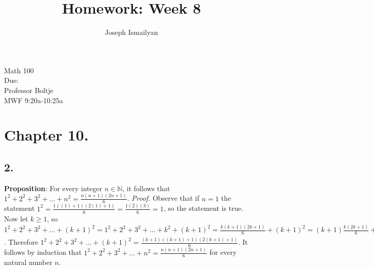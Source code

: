 \documentclass[12pt]{article}
\newcommand{\dueDate}{\formatdate{22}{11}{2017}} %
\newcommand{\hwNum}{8}
\begin{document}
	
	\title{Homework: Week \hwNum}
	\author{Joseph Ismailyan}
	\date{}
	\maketitle
	\begin{flushleft}
		Math 100 \\
		Due: \dueDate \\ 
		Professor Boltje \\
		MWF 9:20a-10:25a
	\end{flushleft}
	
	
	\begin{minipage}[t]{0.40\textwidth}
		
		
		
		\section*{Chapter 10. }
		\subsection*{2.}
		\textbf{Proposition}: For every integer $ n\in\mathbb{N} $, it follows that $ 1^2+2^2+3^2+\ldots+n^2=\frac{n(n+1)(2n+1)}{6} $.  
		\newline\textit{Proof.} Observe that if $ n=1 $ the statement $ 1^2=\frac{1((1)+1)(2(1)+1)}{6}=\frac{1(2)(3)}{6}=1 $, so the statement is true. Now let $ k\geq  1$, so $ 1^2+2^2+3^2+\ldots+(k+1)^2 = 1^2+2^2+3^2+\ldots+k^2+(k+1)^2 = \frac{k(k+1)(2k+1)}{6} + (k+1)^2 = (k+1)\frac{k(2k+1)}{6} + (k+1) = (k+1)(\frac{k(2k+1+ 6k+6)}{6}) = (k+1)(\frac{2k^2+k+6k+6}{6}) = (k+1)(\frac{2k^2+7k+6}{6}) = (k+1)(\frac{2k^2+4k+3k+6}{6}) = (k+1)(\frac{2k(k+1)+3(k+2)}{6})=(k+1)(\frac{(k+2)(2k+3)}{6})=\frac{(k+1)(k+1+1)(2k+2+1)}{6} = \frac{(k+1)((k+1)+1)(2(k+1)+1)}{6} $. Therefore $ 1^2+2^2+3^2+\ldots+(k+1)^2 = \frac{(k+1)((k+1)+1)(2(k+1)+1)}{6} $. It follows by induction that $ 1^2+2^2+3^2+\ldots+n^2=\frac{n(n+1)(2n+1)}{6} $ for every natural number $ n $.
		
		
	\end{minipage}
	\hfill\vline\hfill
\end{document}
